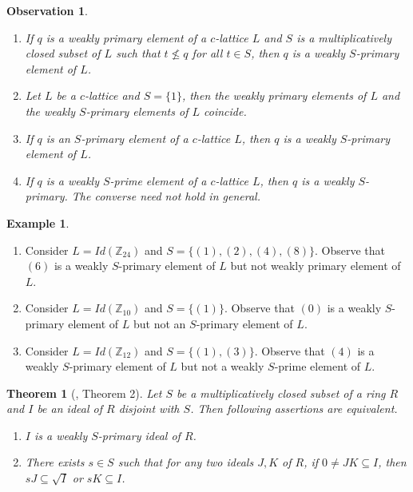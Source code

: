 \documentclass[10pt,twoside,a4paper]{amsart}
\numberwithin{equation}{section}
\theoremstyle{plain}
\newtheorem{thm}[lem]{Theorem}
\newtheorem{obs}[lem]{Observation}
\theoremstyle{definition}
\newtheorem{exa}[lem]{Example}
\begin{document}
	\begin{obs}
		\begin{enumerate}
			\item  If $q$ is a weakly primary element of a $c$-lattice $L$ and $S$ is a multiplicatively closed subset of $L$ such that $t\nleq q$ for all $t\in S$, then $q$ is a weakly $S$-primary element of $L$.
			
			\item Let $L$ be a $c$-lattice and $S=\{1\}$, then the weakly primary elements of $L$ and the weakly $S$-primary elements of $L$ coincide.
			
			\item  If $q$ is an $S$-primary element of a $c$-lattice $L$, then $q$ is a weakly $S$-primary element of $L$.
			
			\item If $q$ is a weakly $S$-prime element of a $c$-lattice $L$, then $q$ is a weakly $S$-primary. The converse need not  hold in general. 
			
		\end{enumerate}
	\end{obs}
	
	\begin{exa}
		\begin{enumerate}
			\item  Consider $L=Id(\mathbb{Z}_{24})$ and $S=\{(1), (2),(4),(8)\}$. Observe that $(6)$ is a weakly $S$-primary element of $L$ but not weakly primary element of $L$.
			
			\item Consider $L=Id(\mathbb{Z}_{10})$ and $S=\{(1)\}$. Observe that $(0)$ is a weakly $S$-primary element of $L$ but not an $S$-primary element of $L$.
			
			\item Consider $L=Id(\mathbb{Z}_{12})$ and $S=\{(1),(3)\}$. Observe that $(4)$ is a weakly $S$-primary element of $L$ but not a weakly $S$-prime element of $L$.
		\end{enumerate}
	\end{exa}
	
	
	


\begin{thm}[\cite{CK}, Theorem 2]\label{T5.5} Let $S$ be a multiplicatively closed subset of a ring $R$ and $I$ be an ideal of $R$ disjoint with $S$. Then following assertions are equivalent.
	
	\begin{enumerate}
		\item $I$ is a weakly $S$-primary ideal of $R$.
		
		\item There exists $s \in S$ such that for any two ideals $J, K$ of $R$, if $0 \neq JK \subseteq I $, then $sJ \subseteq \sqrt{I}$ or $s K \subseteq I$. 
	\end{enumerate}  
	
\end{thm}
\end{document}
